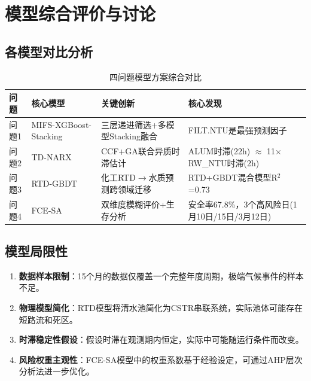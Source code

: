 \documentclass[12pt,a4paper]{ctexart}
\begin{document}
\section{模型综合评价与讨论}

\subsection{各模型对比分析}

\begin{table}[H]
\centering
\caption{四问题模型方案综合对比}
\label{tab:comparison}
\small
\begin{tabular}{p{2cm}p{3cm}p{3cm}p{4cm}}
\toprule
\textbf{问题} & \textbf{核心模型} & \textbf{关键创新} & \textbf{核心发现} \\
\midrule
问题1 & MIFS-XGBoost-Stacking & 三层递进筛选+多模型Stacking融合 & FILT.NTU是最强预测因子 \\
问题2 & TD-NARX & CCF+GA联合异质时滞估计 & ALUM时滞(22h) $\approx$ 11$\times$ RW\_NTU时滞(2h) \\
问题3 & RTD-GBDT & 化工RTD$\to$水质预测跨领域迁移 & RTD+GBDT混合模型R$^2$=0.73 \\
问题4 & FCE-SA & 双维度模糊评价+生存分析 & 安全率67.8\%，3个高风险日(1月10日/15日/3月12日) \\
\bottomrule
\end{tabular}
\end{table}

\subsection{模型局限性}

\begin{enumerate}
    \item \textbf{数据样本限制}：15个月的数据仅覆盖一个完整年度周期，极端气候事件的样本不足。
    \item \textbf{物理模型简化}：RTD模型将清水池简化为CSTR串联系统，实际池体可能存在短路流和死区。
    \item \textbf{时滞稳定性假设}：假设时滞在观测期内恒定，实际中可能随运行条件而改变。
    \item \textbf{风险权重主观性}：FCE-SA模型中的权重系数基于经验设定，可通过AHP层次分析法进一步优化。
\end{enumerate}

\newpage

\end{document}
